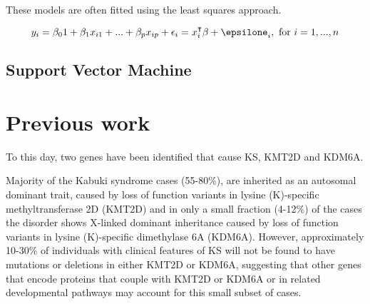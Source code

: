 These models are often fitted using the least squares approach.

\begin{equation}
y_i = \beta_0 1 + \beta_1 x_{i1} + ... + \beta_p x_{ip} + \epsilon_i = x_i^\intercal \beta + \epsilone_i, \text{ for } i = 1,...,n    
\end{equation}

\subsection{Support Vector Machine}


\section{Previous work}
To this day, two genes have been identified that cause KS, KMT2D and KDM6A. %

Majority of the Kabuki syndrome cases (55-80\%), are inherited as an autosomal dominant trait, caused by loss of function variants in lysine (K)-specific methyltransferase 2D (KMT2D) and in only a small fraction (4-12\%) of the cases the disorder shows X-linked dominant inheritance caused by loss of function variants in lysine (K)-specific dimethylase 6A (KDM6A). However, approximately 10-30\% of individuals with clinical features of KS will not be found to have mutations or deletions in either KMT2D or KDM6A, suggesting that other genes that encode proteins that couple with KMT2D or KDM6A or in related developmental pathways may account for this small subset of cases. %

